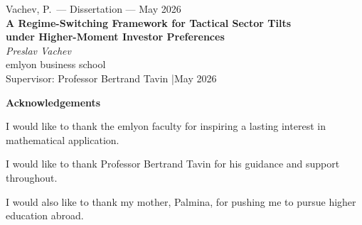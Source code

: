 \documentclass[12pt, a4paper]{article}
\begin{document}
\pagestyle{fancy}
\fancyhf{}
\renewcommand{\headrulewidth}{0pt}
\fancyfoot[R]{\small \thepage}
\fancypagestyle{plain}{%
  \fancyhf{}%
  \renewcommand{\headrulewidth}{0pt}%
  \fancyfoot[C]{\small Vachev, P.}%
  \fancyfoot[R]{\small \thepage}%
}


\begin{titlepage}
  \thispagestyle{empty}
  \centering
  \vspace*{2cm}
  {\small Vachev, P.\ --- Dissertation --- May 2026}\\[0.3cm]
  {\LARGE\bfseries A Regime-Switching Framework for Tactical Sector Tilts\\[0.4em]
   under Higher-Moment Investor Preferences}\\[2cm]
  {\large\itshape Preslav Vachev}\\[0.5cm]
  {\normalsize emlyon business school}\\[1.5cm]
  {\normalsize Supervisor: Professor Bertrand Tavin \quad|\quad May 2026}
  \vfill
\end{titlepage}

\clearpage
\begin{center}
  \vspace*{3cm}
  {\large\bfseries Acknowledgements}
\end{center}
\vspace{1.5cm}

\noindent
I would like to thank the emlyon faculty for inspiring a lasting interest in mathematical application.

\vspace{1cm}

\noindent
I would like to thank Professor Bertrand Tavin for his guidance and support throughout.

\vspace{1cm}

\noindent
I would also like to thank my mother, Palmina, for pushing me to pursue higher education abroad.

\clearpage
\end{document}

